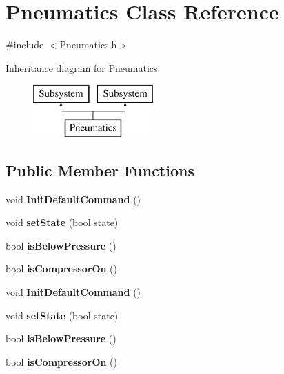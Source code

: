 \hypertarget{class_pneumatics}{}\section{Pneumatics Class Reference}
\label{class_pneumatics}


{\ttfamily \#include $<$Pneumatics.\+h$>$}

Inheritance diagram for Pneumatics\+:\begin{figure}[H]
\begin{center}
\leavevmode
\includegraphics[height=2.000000cm]{class_pneumatics}
\end{center}
\end{figure}
\subsection*{Public Member Functions}
\begin{DoxyCompactItemize}
\item 
\hypertarget{class_pneumatics_a709704e89e84340acfdce2156a2afd77}{}void {\bfseries Init\+Default\+Command} ()\label{class_pneumatics_a709704e89e84340acfdce2156a2afd77}

\item 
\hypertarget{class_pneumatics_ace16220bbadc59be2b6e5c64de231661}{}void {\bfseries set\+State} (bool state)\label{class_pneumatics_ace16220bbadc59be2b6e5c64de231661}

\item 
\hypertarget{class_pneumatics_a54e0a148a7df1915949c35906d6f44e2}{}bool {\bfseries is\+Below\+Pressure} ()\label{class_pneumatics_a54e0a148a7df1915949c35906d6f44e2}

\item 
\hypertarget{class_pneumatics_a21e3b3a6955e7bdc5d545694bb82bcd9}{}bool {\bfseries is\+Compressor\+On} ()\label{class_pneumatics_a21e3b3a6955e7bdc5d545694bb82bcd9}

\item 
\hypertarget{class_pneumatics_a709704e89e84340acfdce2156a2afd77}{}void {\bfseries Init\+Default\+Command} ()\label{class_pneumatics_a709704e89e84340acfdce2156a2afd77}

\item 
\hypertarget{class_pneumatics_ace16220bbadc59be2b6e5c64de231661}{}void {\bfseries set\+State} (bool state)\label{class_pneumatics_ace16220bbadc59be2b6e5c64de231661}

\item 
\hypertarget{class_pneumatics_a54e0a148a7df1915949c35906d6f44e2}{}bool {\bfseries is\+Below\+Pressure} ()\label{class_pneumatics_a54e0a148a7df1915949c35906d6f44e2}

\item 
\hypertarget{class_pneumatics_a21e3b3a6955e7bdc5d545694bb82bcd9}{}bool {\bfseries is\+Compressor\+On} ()\label{class_pneumatics_a21e3b3a6955e7bdc5d545694bb82bcd9}

\end{DoxyCompactItemize}


